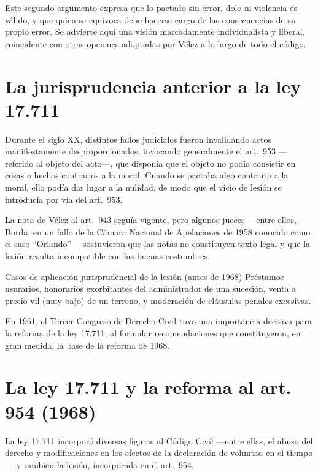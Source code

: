 \documentclass[12pt,oneside]{book}
\begin{document}
Este segundo argumento expresa que lo pactado sin error, dolo ni violencia es válido, y que quien se equivoca debe hacerse cargo de las consecuencias de su propio error. Se advierte aquí una visión marcadamente individualista y liberal, coincidente con otras opciones adoptadas por Vélez a lo largo de todo el código.

\section{La jurisprudencia anterior a la ley 17.711}

Durante el siglo XX, distintos fallos judiciales fueron invalidando actos manifiestamente desproporcionados, invocando generalmente el art.\ 953 —referido al objeto del acto—, que disponía que el objeto no podía consistir en cosas o hechos contrarios a la moral. Cuando se pactaba algo contrario a la moral, ello podía dar lugar a la nulidad, de modo que el vicio de lesión se introducía por vía del art.\ 953.

La nota de Vélez al art.\ 943 seguía vigente, pero algunos jueces —entre ellos, Borda, en un fallo de la Cámara Nacional de Apelaciones de 1958 conocido como el caso ``Orlando''— sostuvieron que las notas no constituyen texto legal y que la lesión resulta incompatible con las buenas costumbres.

\begin{example}{Casos de aplicación jurisprudencial de la lesión (antes de 1968)}
Préstamos usurarios, honorarios exorbitantes del administrador de una sucesión, venta a precio vil (muy bajo) de un terreno, y moderación de cláusulas penales excesivas.
\end{example}

En 1961, el Tercer Congreso de Derecho Civil tuvo una importancia decisiva para la reforma de la ley 17.711, al formular recomendaciones que constituyeron, en gran medida, la base de la reforma de 1968.

\section{La ley 17.711 y la reforma al art. 954 (1968)}

La ley 17.711 incorporó diversas figuras al Código Civil —entre ellas, el abuso del derecho y modificaciones en los efectos de la declaración de voluntad en el tiempo— y también la lesión, incorporada en el art.\ 954.
\end{document}
